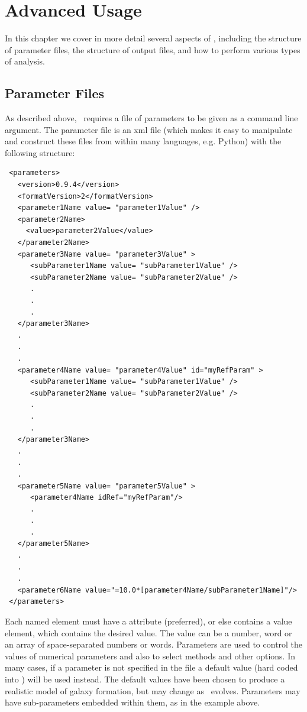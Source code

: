 \chapter{Advanced Usage}

In this chapter we cover in more detail several aspects of \glc, including the structure of parameter files, the structure of output files, and how to perform various types of analysis.

\section{Parameter Files}\label{sec:ParameterFiles}

As described above, \glc\ requires a file of parameters to be given as a command line argument. The parameter file is an \gls{xml} file (which makes it easy to manipulate and construct these files from within many languages, e.g. Python) with the following structure:
\begin{verbatim}
 <parameters>
   <version>0.9.4</version>
   <formatVersion>2</formatVersion>
   <parameter1Name value= "parameter1Value" />
   <parameter2Name>
     <value>parameter2Value</value>
   </parameter2Name>
   <parameter3Name value= "parameter3Value" >
      <subParameter1Name value= "subParameter1Value" />
      <subParameter2Name value= "subParameter2Value" />
      .
      .
      .
   </parameter3Name>
   .
   .
   .
   <parameter4Name value= "parameter4Value" id="myRefParam" >
      <subParameter1Name value= "subParameter1Value" />
      <subParameter2Name value= "subParameter2Value" />
      .
      .
      .
   </parameter3Name>
   .
   .
   .
   <parameter5Name value= "parameter5Value" >
      <parameter4Name idRef="myRefParam"/>
      .
      .
      .
   </parameter5Name>
   .
   .
   .
   <parameter6Name value="=10.0*[parameter4Name/subParameter1Name]"/>
 </parameters>
\end{verbatim}
Each named element must have a  attribute (preferred), or else contains a value element, which contains the desired value. The value can be a number, word or an array of space-separated numbers or words. Parameters are used to control the values of numerical parameters and also to select methods and other options. In many cases, if a parameter is not specified in the file a default value (hard coded into \glc) will be used instead. The default values have been chosen to produce a realistic model of galaxy formation, but may change as \glc\ evolves. Parameters may have sub-parameters embedded within them, as in the example above.

